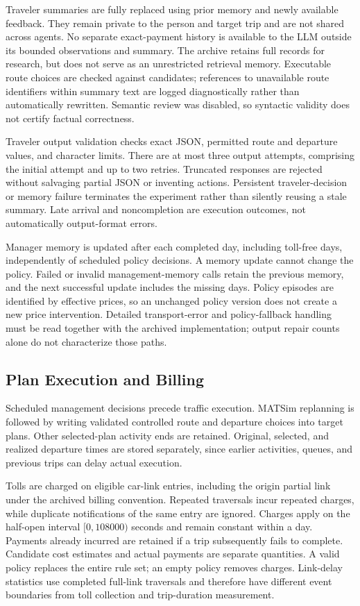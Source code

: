 Traveler summaries are fully replaced using prior memory and newly available feedback. They remain private to the person and target trip and are not shared across agents. No separate exact-payment history is available to the LLM outside its bounded observations and summary. The archive retains full records for research, but does not serve as an unrestricted retrieval memory. Executable route choices are checked against candidates; references to unavailable route identifiers within summary text are logged diagnostically rather than automatically rewritten. Semantic review was disabled, so syntactic validity does not certify factual correctness.

Traveler output validation checks exact JSON, permitted route and departure values, and character limits. There are at most three output attempts, comprising the initial attempt and up to two retries. Truncated responses are rejected without salvaging partial JSON or inventing actions. Persistent traveler-decision or memory failure terminates the experiment rather than silently reusing a stale summary. Late arrival and noncompletion are execution outcomes, not automatically output-format errors.

Manager memory is updated after each completed day, including toll-free days, independently of scheduled policy decisions. A memory update cannot change the policy. Failed or invalid management-memory calls retain the previous memory, and the next successful update includes the missing days. Policy episodes are identified by effective prices, so an unchanged policy version does not create a new price intervention. Detailed transport-error and policy-fallback handling must be read together with the archived implementation; output repair counts alone do not characterize those paths.

\subsection{Plan Execution and Billing}

Scheduled management decisions precede traffic execution. MATSim replanning is followed by writing validated controlled route and departure choices into target plans. Other selected-plan activity ends are retained. Original, selected, and realized departure times are stored separately, since earlier activities, queues, and previous trips can delay actual execution.

Tolls are charged on eligible car-link entries, including the origin partial link under the archived billing convention. Repeated traversals incur repeated charges, while duplicate notifications of the same entry are ignored. Charges apply on the half-open interval $[0,108000)$ seconds and remain constant within a day. Payments already incurred are retained if a trip subsequently fails to complete. Candidate cost estimates and actual payments are separate quantities. A valid policy replaces the entire rule set; an empty policy removes charges. Link-delay statistics use completed full-link traversals and therefore have different event boundaries from toll collection and trip-duration measurement.

